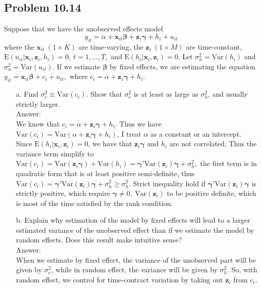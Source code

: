\documentclass[10pt]{article}
\newcommand{\E}{\text{E}}
\newcommand{\V}{\text{Var}}
\begin{document}
\subsection*{Problem 10.14}
Suppose that we have the unobserved effects model
\[y_{it}=\alpha+\textbf{x}_{it}\pmb{\beta}+\textbf{z}_i\pmb{\gamma}+h_i+u_{it}\]
where the $\textbf{x}_{it}\ (1\times K)$ are time-varying, the $\textbf{z}_i\ (1\times M)$ are time-constant, $\E(u_{it}|\textbf{x}_i,\textbf{z}_i,h_i)=0,\ t=1,\ldots,T,$ and $\E(h_i|\textbf{x}_i,\textbf{z}_i)=0.$ Let $\sigma_h^2=\V(h_i)$ and $\sigma_u^2=\V(u_{it}).$ If we estimate $\pmb{\beta}$ by fixed effects, we are estimating the equation $y_{it}=\textbf{x}_{it}\pmb{\beta}+c_i+u_{it},$ where $c_i=\alpha+\textbf{z}_i\pmb{\gamma}+h_i$.  
\begin{enumerate}
\item[a.] Find $\sigma_c^2\equiv \V(c_i)$. Show that $\sigma_c^2$ is at least as large as $\sigma_h^2$, and usually strictly larger.
\\ Answer: \\
We know that $c_i=\alpha+\textbf{z}_i\pmb{\gamma}+h_i$. Thus we have $\V(c_i)=\V(\alpha+\textbf{z}_i\pmb{\gamma}+h_i)$, I treat $\alpha$ as a constant or an intercept. Since $\E(h_i|\textbf{x}_i,\textbf{z}_i)=0$, we have that $\textbf{z}_i\pmb{\gamma} \text{ and } h_i$ are not correlated. Thus the variance term simplify to $\V(c_i)=\V(\textbf{z}_i\pmb{\gamma})+\V(h_i)=\pmb{\gamma}'\V(\textbf{z}_i)\pmb{\gamma}+\sigma_h^2,$ the first term is in quadratic form that is at least positive semi-definite, thus $\V(c_i)=\pmb{\gamma}'\V(\textbf{z}_i)\pmb{\gamma}+\sigma_h^2\geq\sigma_h^2.$ Strict inequality hold if $\pmb{\gamma}'\V(\textbf{z}_i)\pmb{\gamma}$ is strictly positive, which require $\pmb{\gamma}\neq0,\ \V(\textbf{z}_i)$ to be positive definite, which is most of the time satisfied by the rank condition.

\item[b.] Explain why estimation of the model by fixed effects will lead to a larger estimated variance of the unobserved effect than if we estimate the model by random effects. Does this result make intuitive sense? 
\\ Answer: \\
When we estimate by fixed effect, the variance of the unobserved part will be given by $\sigma_c^2$, while in random effect, the variance will be given by $\sigma_h^2.$ So, with random effect, we control for time-contract variation by taking out $\textbf{z}_i$ from $c_i$.


\end{enumerate}
\end{document}
